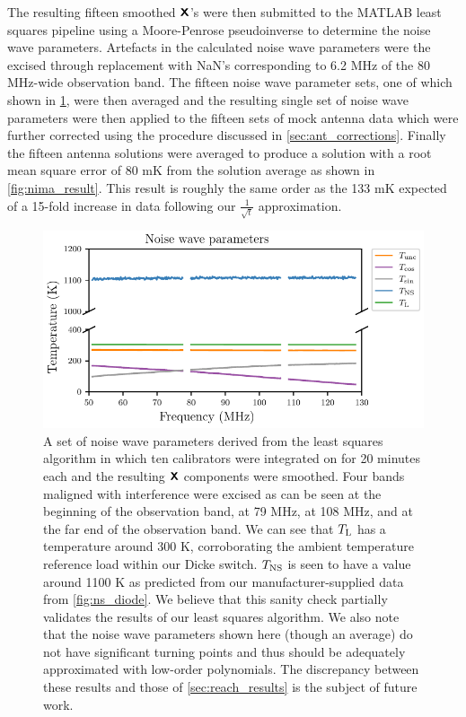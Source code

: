 The resulting fifteen smoothed $\textbf{\textsf{X}}$'s were then submitted to the MATLAB least squares pipeline using a Moore-Penrose pseudoinverse to determine the noise wave parameters. Artefacts in the calculated noise wave parameters were the excised through replacement with NaN’s corresponding to 6.2 MHz of the 80 MHz-wide observation band. The fifteen noise wave parameter sets, one of which shown in \cref{fig:ls_nwps}, were then averaged and the resulting single set of noise wave parameters were then applied to the fifteen sets of mock antenna data which were further corrected using the procedure discussed in \cref{sec:ant_corrections}. Finally the fifteen antenna solutions were averaged to produce a solution with a root mean square error of 80 mK from the solution average as shown in \cref{fig:nima_result}. This result is roughly the same order as the 133 mK expected of a 15-fold increase in data following our $\frac{1}{\sqrt{t}}$ approximation.
\begin{figure}
    \centering
    \includegraphics[width=.8\textwidth]{ls_nwps}
    \caption{A set of noise wave parameters derived from the least squares algorithm in which ten calibrators were integrated on for 20 minutes each and the resulting $\textbf{\textsf{X}}$ components were smoothed. Four bands maligned with interference were excised as can be seen at the beginning of the observation band, at 79 MHz, at 108 MHz, and at the far end of the observation band. We can see that $T_{\mathrm{L}}$ has a temperature around 300 K, corroborating the ambient temperature reference load within our Dicke switch. $T_{\mathrm{NS}}$ is seen to have a value around 1100 K as predicted from our manufacturer-supplied data from \cref{fig:ns_diode}. We believe that this sanity check partially validates the results of our least squares algorithm. We also note that the noise wave parameters shown here (though an average) do not have significant turning points and thus should be adequately approximated with low-order polynomials. The discrepancy between these results and those of \cref{sec:reach_results} is the subject of future work.}
    \label{fig:ls_nwps}
\end{figure}
